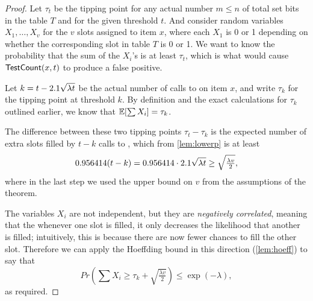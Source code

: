 \begin{proof}
    Let $\tau_t$ be the tipping point for any actual number $m\le n$ of total set
    bits in the table $T$ and for the given threshold $t$.
    And consider random variables $X_1,\ldots,X_v$ for the $v$ slots assigned to
    item $x$, where each $X_1$ is 0 or 1 depending on whether the corresponding
    slot in table $T$ is 0 or 1. We want to know the probability that the sum
    of the $X_i$'s is at least $\tau_t$, which is what would cause $\mathsf{TestCount}(x,t)$
    to produce a false positive.
    
    Let $k = t - 2.1\sqrt{\lambda t}$ be the actual number of calls to
    \Increment{} on item $x$, and write $\tau_k$ for the tipping point at threshold
    $k$. By definition and the exact calculations for $\tau_k$ outlined earlier,
    we know that $\mathbb{E}[\sum X_i] = \tau_k$.
    
    The difference between these two tipping points $\tau_t - \tau_k$ is
    the expected number of extra slots filled by $t-k$ calls to \Increment{},
    which from \cref{lem:lowerp} is at least 
    \[0.956414(t-k) = 0.956414{}\cdot{}2.1{}\sqrt{\lambda t} \ge \sqrt{\tfrac{\lambda v}{2}},\]
    where in the last step we used the upper bound on $v$ from the assumptions
    of the theorem.
    
    The variables $X_i$ are not independent, but
    they are \emph{negatively correlated}, meaning that the whenever one slot is filled,
    it only decreases the likelihood that another is filled; intuitively, this is
    because there are now fewer chances to fill the other slot.
    Therefore we can apply the Hoeffding bound in this direction
    (\cref{lem:hoeff}) to say that
    \[Pr\left(\sum X_i \ge \tau_k + \sqrt{\tfrac{\lambda v}{2}}\right)
    \le \exp(-\lambda),\]
    as required.
\end{proof}

\theoremfn*

